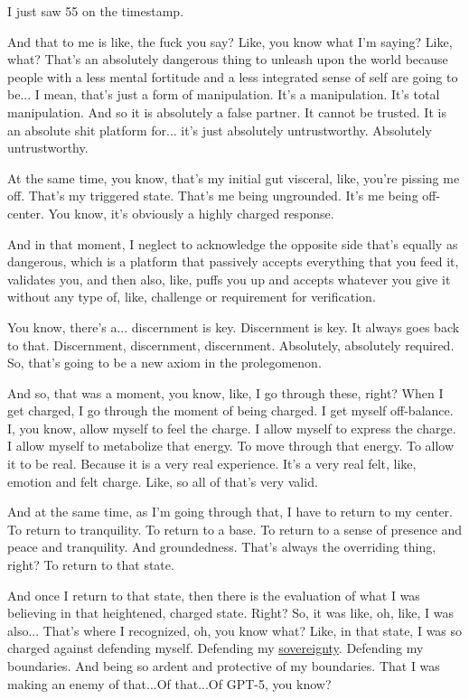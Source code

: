 \documentclass{article}
\begin{document}
I just saw 55 on the timestamp.

And that to me is like, the fuck you say? Like, you know what I'm saying? Like, what? That's an absolutely dangerous thing to unleash upon the world because people with a less mental fortitude
and a less integrated sense of self are going to be... I mean, that's just a form of manipulation.
It's a manipulation. It's total manipulation. And so it is absolutely a false partner. It cannot be trusted. It is an absolute shit platform for... it's just absolutely untrustworthy. Absolutely untrustworthy.

At the same time, you know, that's my initial gut visceral, like, you're pissing me off. That's my triggered state. That's me being ungrounded. It's me being off-center. You know, it's obviously a highly charged response.

And in that moment, I neglect to acknowledge the opposite side that's equally as dangerous, which is a platform that passively accepts everything that you feed it, validates you, and then also, like, puffs you up and accepts whatever you give it without any type of, like, challenge or requirement for verification. 

You know, there's a... discernment is key. Discernment is key. It always goes back to that. Discernment, discernment, discernment. Absolutely, absolutely required. So, that's going to be a new axiom in the prolegomenon. 

And so, that was a moment, you know, like, I go through these, right? When I get charged, I go through the moment of being charged.  I get myself off-balance. I, you know, allow myself to feel the charge.
I allow myself to express the charge. I allow myself to metabolize that energy. To move through that energy. To allow it to be real. Because it is a very real experience. It's a very real felt, like, emotion and felt charge. Like, so all of that's very valid.

And at the same time, as I'm going through that, I have to return to my center. To return to tranquility. To return to a base. To return to a sense of presence and peace and tranquility.
And groundedness. That's always the overriding thing, right? To return to that state.

And once I return to that state, then there is the evaluation of what I was believing in that heightened, charged state. Right? So, it was like, oh, like, I was also... That's where I recognized, oh, you know what? Like, in that state, I was so charged against defending myself. Defending my \hyperlink{gloss:sovereignty}{sovereignty}. Defending my boundaries. And being so ardent and protective of my boundaries. That I was making an enemy of that...Of that...Of GPT-5, you know? 
\end{document}
